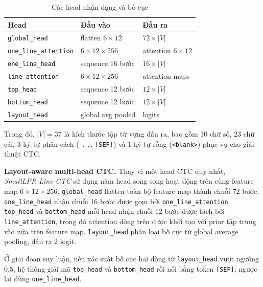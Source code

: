 \documentclass[../DoAn.tex]{subfiles}
\begin{document}
\begin{table}[htbp]
\centering
\small
\renewcommand{\arraystretch}{1.2}
\caption{Các head nhận dạng và bố cục}
\label{tab:recognition-layout-heads}
\begin{tabularx}{\textwidth}{>{\raggedright\arraybackslash}p{4.5cm}>{\raggedright\arraybackslash}X>{\centering\arraybackslash}p{2.0cm}}
\hline
\textbf{Head} & \textbf{Đầu vào} & \textbf{Đầu ra} \\
\hline
\texttt{global\_head} & flatten $6 \times 12$ & $72 \times |V|$ \\
\hline
\texttt{one\_line\_attention} & $6 \times 12 \times 256$ & attention $6 \times 12$ \\
\hline
\texttt{one\_line\_head} & sequence 16 bước & $16 \times |V|$ \\
\hline
\texttt{line\_attention} & $6 \times 12 \times 256$ & 2 attention maps \\
\hline
\texttt{top\_head} & sequence 12 bước & $12 \times |V|$ \\
\hline
\texttt{bottom\_head} & sequence 12 bước & $12 \times |V|$ \\
\hline
\texttt{layout\_head} & global avg pooled & 2 logits \\
\hline
\end{tabularx}
\end{table}

Trong đó, $|V| = 37$ là kích thước tập từ vựng đầu ra, bao gồm 10 chữ số, 23 chữ cái, 3 ký tự phân cách (\texttt{-}, \texttt{.}, \texttt{[SEP]}) và 1 ký tự rỗng (\texttt{<blank>}) phục vụ cho giải thuật CTC.

\textbf{Layout-aware multi-head CTC.}
Thay vì một head CTC duy nhất, \textit{SmallLPR-Line-CTC} sử dụng năm head
song song hoạt động trên cùng feature map $6 \times 12 \times 256$.
\texttt{global\_head} flatten toàn bộ feature map thành chuỗi 72 bước.
\texttt{one\_line\_head} nhận chuỗi 16 bước được gom bởi
\texttt{one\_line\_attention}.
\texttt{top\_head} và \texttt{bottom\_head} mỗi head nhận chuỗi 12 bước
được tách bởi \texttt{line\_attention}, trong đó attention dòng trên được
khởi tạo với prior tập trung vào nửa trên feature map.
\texttt{layout\_head} phân loại bố cục từ global average pooling, đầu ra
2 logit.

Ở giai đoạn suy luận, nếu xác suất bố cục hai dòng từ
\texttt{layout\_head} vượt ngưỡng $0.5$, hệ thống giải mã
\texttt{top\_head} và \texttt{bottom\_head} rồi nối bằng token
\texttt{[SEP]}; ngược lại dùng \texttt{one\_line\_head}.
\end{document}
